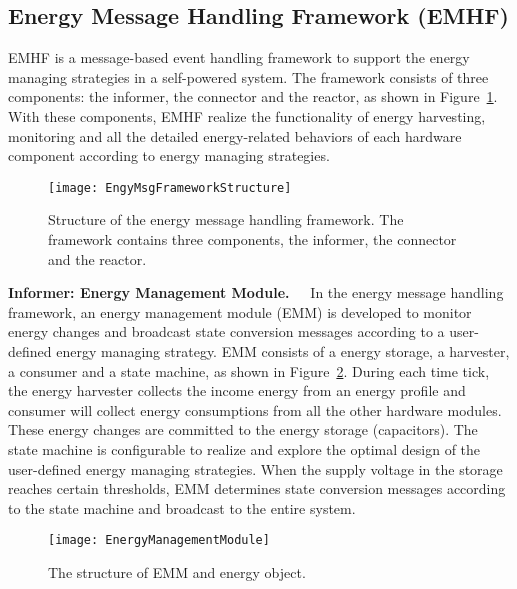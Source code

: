 \subsection{Energy Message Handling Framework (EMHF)}	\label{sec:tech-EMHF}
EMHF is a message-based event handling framework to support the energy managing strategies in a self-powered system.
The framework consists of three components: the informer, the connector and the reactor, as shown in Figure~\ref{fig:EngyMsgFrameworkStructure}. 
With these components, EMHF realize the functionality of energy harvesting, monitoring and all the detailed energy-related behaviors of each hardware component according to energy managing strategies.

\begin{figure}[!htpb]
	\centering
	\texttt{[image: EngyMsgFrameworkStructure]}
	\vspace{-5pt}
	\caption{Structure of the energy message handling framework. The framework contains three components, the informer, the connector and the reactor.}		\label{fig:EngyMsgFrameworkStructure}
\end{figure}

\textbf{Informer: Energy Management Module.\ \ }
In the energy message handling framework, an energy management module (EMM) is developed to monitor energy changes and broadcast state conversion messages according to a user-defined energy managing strategy.
EMM consists of a energy storage, a harvester, a consumer and a state machine, as shown in Figure~\ref{fig:EnergyManagementModule}. 
During each time tick, the energy harvester collects the income energy from an energy profile and consumer will collect energy consumptions from all the other hardware modules. 
These energy changes are committed to the energy storage (capacitors). 
The state machine is configurable to realize and explore the optimal design of the user-defined energy managing strategies. 
When the supply voltage in the storage reaches certain thresholds, EMM determines state conversion messages according to the state machine and broadcast to the entire system.

\begin{figure}[!htpb]
	\centering
	\vspace{-5pt}
	\texttt{[image: EnergyManagementModule]}
	\vspace{-10pt}
	\caption{The structure of EMM and energy object.}		\label{fig:EnergyManagementModule}
\end{figure}

